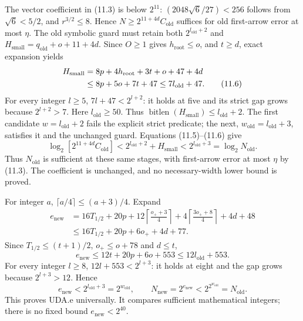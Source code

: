 The vector coefficient in (11.3) is below $2^{11}$:
$(2048\sqrt6/27)<256$ follows from $\sqrt6<5/2$, and $r^{3/2}\le8$.
Hence $N\ge2^{11+4d}C_{\mathrm{old}}$ suffices for old first-arrow error
at most $\eta$. The old symbolic guard must retain both
$2^{l_{\mathrm{old}}+2}$ and $H_{\mathrm{small}}=q_{\mathrm{old}}+o+11+4d$.
Since $O\ge1$ gives $h_{\mathrm{root}}\le o$, and $t\ge d$, exact expansion yields
\begin{align}
 H_{\mathrm{small}}&=8p+4h_{\mathrm{root}}+3t+o+47+4d\notag\\
 &\le8p+5o+7t+47\le7l_{\mathrm{old}}+47.\tag{11.6}
\end{align}
For every integer $l\ge5$, $7l+47<2^{l+2}$: it holds at five and its
strict gap grows because $2^{l+2}>7$. Here $l_{\mathrm{old}}\ge50$.
Thus $\operatorname{bitlen}(H_{\mathrm{small}})\le l_{\mathrm{old}}+2$.
The first candidate $w=l_{\mathrm{old}}+2$ fails the explicit strict
predicate; the next, $w_{\mathrm{old}}=l_{\mathrm{old}}+3$, satisfies it
and the unchanged guard. Equations (11.5)--(11.6) give
\begin{equation}
 \log_2[2^{11+4d}C_{\mathrm{old}}]
 <2^{l_{\mathrm{old}}+2}+H_{\mathrm{small}}
 <2^{l_{\mathrm{old}}+3}=\log_2N_{\mathrm{old}}.\tag{11.7}
\end{equation}
Thus $N_{\mathrm{old}}$ is sufficient at these same stages, with first-arrow
error at most $\eta$ by (11.3). The coefficient is unchanged, and no
necessary-width lower bound is proved.

For integer $a$, $\lceil a/4\rceil\le(a+3)/4$. Expand
\begin{align*}
 e_{\mathrm{new}}
 &=16T_{1/2}+20p+12\left\lceil\frac{o_++3}{4}\right\rceil
     +4\left\lceil\frac{3o_++8}{4}\right\rceil+4d+48\\
 &\le16T_{1/2}+20p+6o_++4d+77.
\end{align*}
Since $T_{1/2}\le(t+1)/2$, $o_+\le o+78$ and $d\le t$,
\begin{equation}
 e_{\mathrm{new}}\le12t+20p+6o+553\le12l_{\mathrm{old}}+553.\tag{11.8}
\end{equation}
For every integer $l\ge8$, $12l+553<2^{l+3}$: it holds at eight and the
gap grows because $2^{l+3}>12$. Hence
\begin{equation}
 e_{\mathrm{new}}<2^{l_{\mathrm{old}}+3}=2^{w_{\mathrm{old}}},\qquad
 N_{\mathrm{new}}=2^{e_{\mathrm{new}}}<2^{2^{w_{\mathrm{old}}}}=N_{\mathrm{old}}.
 \tag{11.9}
\end{equation}
This proves UDA.e universally. It compares sufficient mathematical integers;
there is no fixed bound $e_{\mathrm{new}}<2^{40}$.

